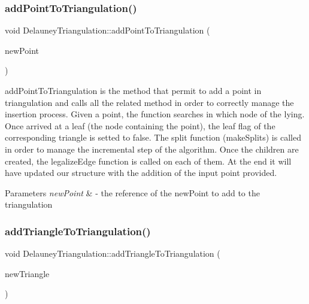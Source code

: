 \subsubsection{\texorpdfstring{add\+Point\+To\+Triangulation()}{addPointToTriangulation()}}
{\footnotesize\ttfamily void Delauney\+Triangulation\+::add\+Point\+To\+Triangulation (\begin{DoxyParamCaption}\item[{const cg3\+::\+Point2\+Dd \&}]{new\+Point }\end{DoxyParamCaption})}



add\+Point\+To\+Triangulation is the method that permit to add a point in triangulation and calls all the related method in order to correctly manage the insertion process. Given a point, the function searches in which node of the lying. Once arrived at a leaf (the node containing the point), the leaf flag of the corresponding triangle is setted to false. The split function (make\+Splits) is called in order to manage the incremental step of the algorithm. Once the children are created, the legalize\+Edge function is called on each of them. At the end it will have updated our structure with the addition of the input point provided. 


\begin{DoxyParams}{Parameters}
{\em new\+Point} & -\/ the reference of the new\+Point to add to the triangulation \\
\hline
\end{DoxyParams}
\mbox{\label{classDelauneyTriangulation_a276538553a118707d395659d035cc1a4}} 
\subsubsection{\texorpdfstring{add\+Triangle\+To\+Triangulation()}{addTriangleToTriangulation()}}
{\footnotesize\ttfamily void Delauney\+Triangulation\+::add\+Triangle\+To\+Triangulation (\begin{DoxyParamCaption}\item[{const \hyperlink{classTriangle}{Triangle} \&}]{new\+Triangle }\end{DoxyParamCaption})\hspace{0.3cm}{\ttfamily [inline]}}



